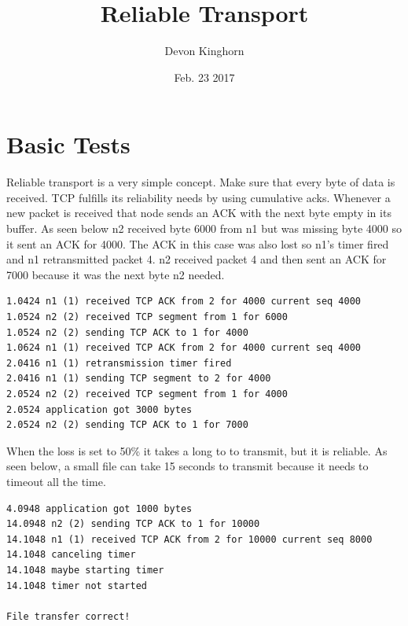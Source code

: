\documentclass[fleqn,11pt]{article}
\begin{document}
\lstset{
  language=Python,
  basicstyle=\small,          %
  keywordstyle=\bfseries,
  identifierstyle=,           %
  commentstyle=,              %
  stringstyle=\ttfamily,      %
  showstringspaces=false,     %
  numbers=left,
  numberstyle=\tiny,
  numbersep=5pt,
  frame=tb,
}

\title{Reliable Transport}

\author{Devon Kinghorn}

\date{Feb. 23 2017}

\maketitle

\section{Basic Tests}

Reliable transport is a very simple concept. Make sure that every byte of data is received. 
TCP fulfills its reliability needs by using cumulative acks. 
Whenever a new packet is received that node sends an ACK with the next byte empty in its buffer.
As seen below n2 received byte 6000 from n1 but was missing byte 4000 so it sent an ACK for 4000.
The ACK in this case was also lost so n1's timer fired and n1 retransmitted packet 4.
n2 received packet 4 and then sent an ACK for 7000 because it was the next byte n2 needed.

\begin{lstlisting}
1.0424 n1 (1) received TCP ACK from 2 for 4000 current seq 4000
1.0524 n2 (2) received TCP segment from 1 for 6000
1.0524 n2 (2) sending TCP ACK to 1 for 4000
1.0624 n1 (1) received TCP ACK from 2 for 4000 current seq 4000
2.0416 n1 (1) retransmission timer fired
2.0416 n1 (1) sending TCP segment to 2 for 4000
2.0524 n2 (2) received TCP segment from 1 for 4000
2.0524 application got 3000 bytes
2.0524 n2 (2) sending TCP ACK to 1 for 7000
\end{lstlisting}

When the loss is set to 50\% it takes a long to to transmit, but it is reliable. As seen below,
 a small file can take 15 seconds to transmit because it needs to timeout all the time.

 \begin{lstlisting}
4.0948 application got 1000 bytes
14.0948 n2 (2) sending TCP ACK to 1 for 10000
14.1048 n1 (1) received TCP ACK from 2 for 10000 current seq 8000
14.1048 canceling timer
14.1048 maybe starting timer
14.1048 timer not started

File transfer correct!
 \end{lstlisting}
\end{document}
